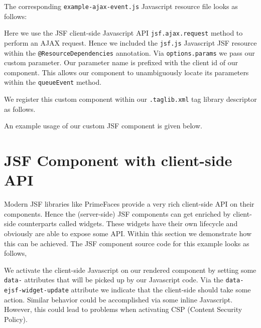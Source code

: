 The corresponding \texttt{example-ajax-event.js} Javascript resource file looks as follows:

Here we use the JSF client-side Javascript API \texttt{jsf.ajax.request} method to perform an AJAX request.
Hence we included the \texttt{jsf.js} Javascript JSF resource within the \texttt{@ResourceDependencies} annotation.
Via \texttt{options.params} we pass our custom parameter.
Our parameter name is prefixed with the client id of our component.
This allows our component to unambiguously locate its parameters within the \texttt{queueEvent} method.

We register this custom component within our \texttt{.taglib.xml} tag library descriptor as follows.


An example usage of our custom JSF component is given below.


\section{JSF Component with client-side API}
Modern JSF libraries like PrimeFaces provide a very rich client-side API on their components.
Hence the (server-side) JSF components can get enriched by client-side counterparts called widgets.
These widgets have their own lifecycle and obviously are able to expose some API.
Within this section we demonstrate how this can be achieved.
The JSF component source code for this example looks as follows,

We activate the client-side Javascript on our rendered component by setting some \texttt{data-} attributes that will be picked up by our Javascript code.
Via the \texttt{data-ejsf-widget\allowbreak -update} attribute we indicate that the client-side should take some action.
Similar behavior could be accomplished via some inline Javascript.
However, this could lead to problems when activating CSP (Content Security Policy).

